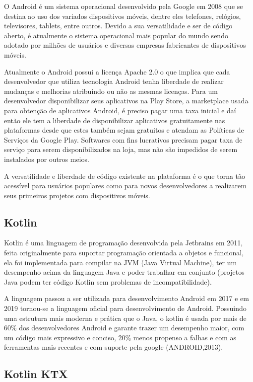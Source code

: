 O Android é um sistema operacional desenvolvido pela Google em 2008 que se destina ao uso dos variados dispositivos móveis, dentre eles telefones, relógios, televisores, tablets, entre outros.
Devido a sua versatilidade e ser de código aberto, é atualmente o sistema operacional mais popular do mundo sendo adotado por milhões de usuários e diversas empresas fabricantes de dispositivos móveis.

Atualmente o Android possui a licença Apache 2.0 o que implica que cada desenvolvedor que utiliza tecnologia Android tenha liberdade de realizar mudanças e melhorias atribuindo ou não as mesmas licenças.
Para um desenvolvedor disponibilizar seus aplicativos na Play Store, a marketplace usada para obtenção de aplicativos Android, é preciso pagar uma taxa inicial e daí então ele tem a liberdade de disponibilizar aplicativos gratuitamente nas plataformas desde que estes também sejam gratuitos e atendam as Políticas de Serviços da Google Play.
Softwares com fins lucrativos precisam pagar taxa de serviço para serem disponibilizados na loja, mas não são impedidos de serem instalados por outros meios.

A versatilidade e liberdade de código existente na plataforma é o que torna tão acessível para usuários populares como para novos desenvolvedores a realizarem seus primeiros projetos com dispositivos móveis.

\subsection{Kotlin}\label{subsec:kotlin}

Kotlin é uma linguagem de programação desenvolvida pela Jetbrains em 2011, feita originalmente para suportar programação orientada a objetos e funcional, ela foi implementada para compilar na JVM (Java Virtual Machine), ter um desempenho acima da linguagem Java e poder trabalhar em conjunto (projetos Java podem ter código Kotlin sem problemas de incompatibilidade).

A linguagem passou a ser utilizada para desenvolvimento Android em 2017 e em 2019 tornou-se a linguagem oficial para desenvolvimento de Android.
Possuindo uma estrutura mais moderna e prática que o Java, o kotlin é usada por mais de 60\% dos desenvolvedores Android e garante trazer um desempenho maior, com um código mais expressivo e conciso, 20\% menos propenso a falhas e com as ferramentas mais recentes e com suporte pela google (ANDROID,2013).

\subsection{Kotlin KTX}\label{subsec:kotlin-ktx}

